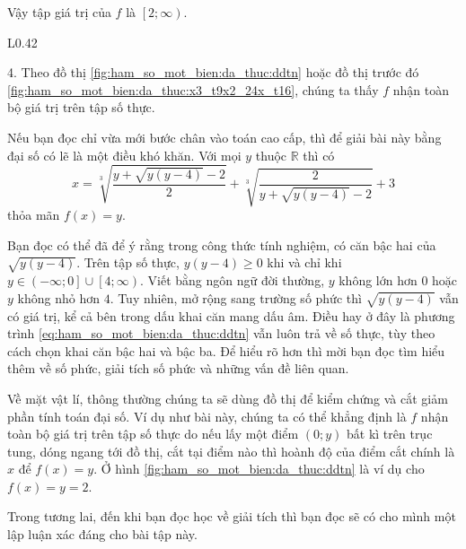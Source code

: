 Vậy tập giá trị của $f$ là $\boxed{\left[2; \infty\right)}$.


\begin{wrapfigure}{L}{0.42\textwidth}
   \centering
   \captionsetup{justification=centering}
   \caption{Dóng điểm để tìm nghiệm với ví dụ $y = 2$}
   \label{fig:ham_so_mot_bien:da_thuc:ddtn}
\end{wrapfigure}

4. Theo đồ thị \ref{fig:ham_so_mot_bien:da_thuc:ddtn} hoặc đồ thị trước đó \ref{fig:ham_so_mot_bien:da_thuc:x3_t9x2_24x_t16}, chúng ta thấy $f$ nhận toàn bộ giá trị trên tập số thực. 

Nếu bạn đọc chỉ vừa mới bước chân vào toán cao cấp, thì để giải bài này bằng đại số có lẽ là một điều khó khăn. Với mọi $y$ thuộc $\mathbb{R}$ thì có \begin{equation}x = \sqrt[3]{\frac{y + \sqrt{y(y-4)}-2}{2}} + \sqrt[3]{\frac{2}{y + \sqrt{y(y-4)}-2}} + 3 \label{eq:ham_so_mot_bien:da_thuc:ddtn}\end{equation}
thỏa mãn $f(x) = y$.

Bạn đọc có thể đã để ý rằng trong công thức tính nghiệm, có căn bậc hai của $\sqrt{y(y-4)}$. Trên tập số thực, $y(y-4) \geq 0$ khi và chỉ khi $y\in\left(-\infty; 0\right]\cup\left[4; \infty\right)$. Viết bằng ngôn ngữ đời thường, $y$ không lớn hơn $0$ hoặc $y$ không nhỏ hơn $4$. Tuy nhiên, mở rộng sang trường số phức thì $\sqrt{y(y-4)}$ vẫn có giá trị, kể cả bên trong dấu khai căn mang dấu âm. Điều hay ở đây là phương trình \ref{eq:ham_so_mot_bien:da_thuc:ddtn} vẫn luôn trả về số thực, tùy theo cách chọn khai căn bậc hai và bậc ba. Để hiểu rõ hơn thì mời bạn đọc tìm hiểu thêm về số phức, giải tích số phức và những vấn đề liên quan.

Về mặt vật lí, thông thường chúng ta sẽ dùng đồ thị để kiểm chứng và cắt giảm phần tính toán đại số. Ví dụ như bài này, chúng ta có thể khẳng định là $f$ nhận toàn bộ giá trị trên tập số thực do nếu lấy một điểm $\left(0; y\right)$ bất kì trên trục tung, dóng ngang tới đồ thị, cắt tại điểm nào thì hoành độ của điểm cắt chính là $x$ để $f(x) = y$. Ở hình \ref{fig:ham_so_mot_bien:da_thuc:ddtn} là ví dụ cho $f(x) = y = 2$.

Trong tương lai, đến khi bạn đọc học về giải tích thì bạn đọc sẽ có cho mình một lập luận xác đáng cho bài tập này.
